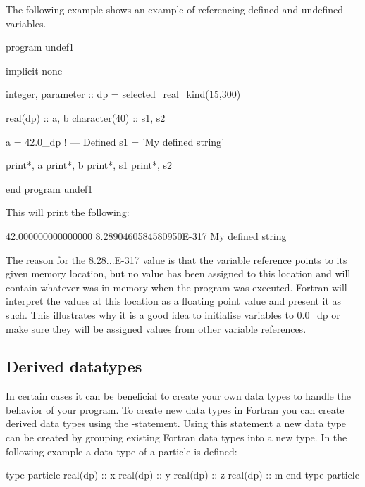 The following example shows an example of referencing defined and undefined variables.

\begin{fortrancodeenv}
program undef1

    implicit none

    integer, parameter :: dp = selected_real_kind(15,300)

    real(dp) :: a, b
    character(40) :: s1, s2

    a = 42.0_dp ! --- Defined
    s1 = 'My defined string'

    print*, a
    print*, b
    print*, s1
    print*, s2

end program undef1
\end{fortrancodeenv}

This will print the following:

\begin{fortrancodeenv}
   42.000000000000000
   8.2890460584580950E-317
 My defined string

\end{fortrancodeenv}

The reason for the 8.28...E-317 value is that the variable reference  points to its given memory location, but no value has been assigned to this location and will contain whatever was in memory when the program was executed. Fortran will interpret the values at this location as a floating point value and present it as such. This illustrates why it is a good idea to initialise variables to 0.0\_dp or make sure they will be assigned values from other variable references.

\subsection{Derived datatypes}

In certain cases it can be beneficial to create your own data types to handle the behavior of your program. To create new data types in Fortran you can create derived data types using the -statement. Using this statement a new data type can be created by grouping existing Fortran data types into a new type. In the following example a data type of a particle is defined:

\begin{fortrancodeenv}
type particle
    real(dp) :: x
    real(dp) :: y
    real(dp) :: z
    real(dp) :: m
end type particle
\end{fortrancodeenv}

